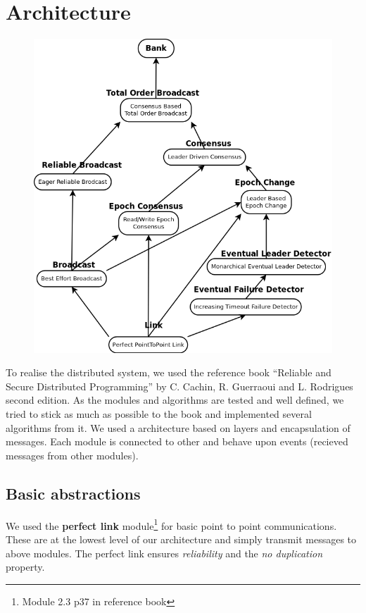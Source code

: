 \documentclass[11pt,english,a4paper]{article}
\begin{document}
\section{Architecture}
\begin{figure}[h]\centering
  \includegraphics[width=\textwidth]{arch.png}
\end{figure}
To realise the distributed system, we used the reference book ``Reliable and Secure Distributed Programming'' by C. Cachin, R. Guerraoui and L. Rodrigues second edition.
As the modules and algorithms are tested and well defined, we tried to stick as much as possible to the book and implemented several algorithms from it.
We used a architecture based on layers and encapsulation of messages.
Each module is connected to other and behave upon events (recieved messages from other modules).

\subsection*{Basic abstractions}
We used the \textbf{perfect link} module\footnote{Module 2.3 p37 in reference book} for basic point to point communications.
These are at the lowest level of our architecture and simply transmit messages to above modules.
The perfect link ensures \emph{reliability} and the \emph{no duplication} property.\\
\end{document}
